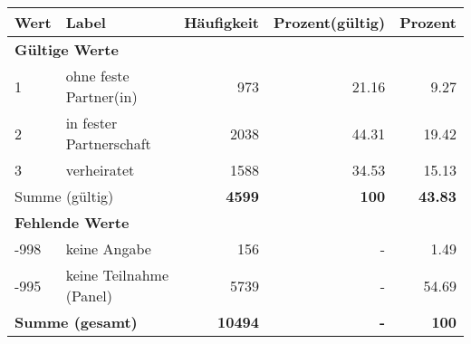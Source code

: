      \begin{longtable}{lXrrr}
     \toprule
     \textbf{Wert} & \textbf{Label} & \textbf{Häufigkeit} & \textbf{Prozent(gültig)} & \textbf{Prozent} \\
     \endhead
     \midrule
     \multicolumn{5}{l}{\textbf{Gültige Werte}}\\

     1 &
     \multicolumn{1}{X}{ ohne feste Partner(in)   } &


       \num{973} &
       \num[round-mode=places,round-precision=2]{21.16} &
         \num[round-mode=places,round-precision=2]{9.27} \\

     2 &
     \multicolumn{1}{X}{ in fester Partnerschaft   } &


       \num{2038} &
       \num[round-mode=places,round-precision=2]{44.31} &
         \num[round-mode=places,round-precision=2]{19.42} \\

     3 &
     \multicolumn{1}{X}{ verheiratet   } &


       \num{1588} &
       \num[round-mode=places,round-precision=2]{34.53} &
         \num[round-mode=places,round-precision=2]{15.13} \\
     \midrule
     \multicolumn{2}{l}{Summe (gültig)} &
       \textbf{\num{4599}} &
     \textbf{\num{100}} &
       \textbf{\num[round-mode=places,round-precision=2]{43.83}} \\
     \multicolumn{5}{l}{\textbf{Fehlende Werte}}\\
       -998 &
       keine Angabe &
         \num{156} &
        - &
         \num[round-mode=places,round-precision=2]{1.49} \\
       -995 &
       keine Teilnahme (Panel) &
         \num{5739} &
        - &
         \num[round-mode=places,round-precision=2]{54.69} \\
     \midrule
     \multicolumn{2}{l}{\textbf{Summe (gesamt)}} &
          \textbf{\num{10494}} &
        \textbf{-} &
        \textbf{\num{100}} \\
     \bottomrule
     \end{longtable}
     
